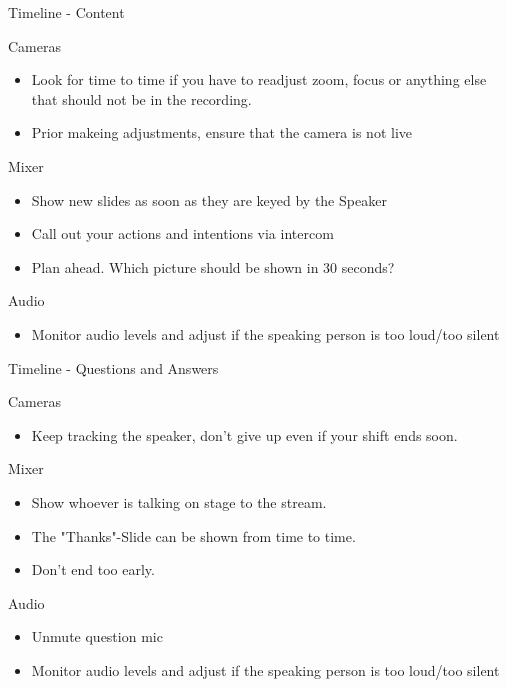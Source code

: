 \documentclass[aspectratio=169]{beamer}
\begin{document}
\begin{frame}{Timeline - Content}
	\begin{block}{Cameras}
		\begin{itemize}
			\item Look for time to time if you have to readjust zoom, focus or anything else that should not be in the recording.
			\item Prior makeing adjustments, ensure that the camera is not live
		\end{itemize}
	\end{block}
	
	\begin{block}{Mixer}
		\begin{itemize}
			\item Show new slides as soon as they are keyed by the Speaker 
			\item Call out your actions and intentions via intercom
			\item Plan ahead. Which picture should be shown in 30 seconds?
		\end{itemize}
	\end{block}

	\begin{block}{Audio}
		\begin{itemize}
			\item Monitor audio levels and adjust if the speaking person is too loud/too silent
		\end{itemize}
	\end{block}

\end{frame}

\begin{frame}{Timeline - Questions and Answers}
	\begin{block}{Cameras}
		\begin{itemize}
			\item Keep tracking the speaker, don't give up even if your shift ends soon.
		\end{itemize}
	\end{block}
	
	\begin{block}{Mixer}
		\begin{itemize}
			\item Show whoever is talking on stage to the stream.
			\item The "Thanks"-Slide can be shown from time to time.
			\item Don't end too early.
		\end{itemize}
	\end{block}

	\begin{block}{Audio}
	\begin{itemize}
		\item Unmute question mic 
			\item Monitor audio levels and adjust if the speaking person is too loud/too silent
	\end{itemize}
\end{block}
\end{frame}
\end{document}
